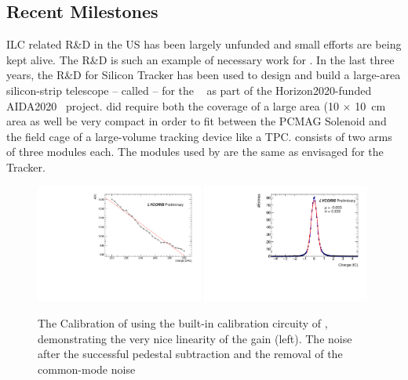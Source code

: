 \subsection{Recent Milestones}
ILC related R\&D in the US has been largely unfunded and small efforts are being kept alive. The \KPIX R\&D is such an example of necessary work for \SID.
In the last three years, the R\&D for \KPIX Silicon Tracker has been used to design and build a large-area silicon-strip 
telescope -- called \LYCORIS -- for the \DIITBF~\cite{desytb2018} as part of the Horizon2020-funded AIDA2020~\cite{AIDA2020} project.
\LYCORIS did require both the coverage of a large area (10 $\times$ \SI{10}{\centi\meter} area as well be very compact in order to fit
between the PCMAG Solenoid and the field cage of a large-volume tracking device like a TPC. \LYCORIS consists of two arms of three modules each. The modules used by \LYCORIS are 
the same as envisaged for the \SID Tracker.
\begin{figure}[htbp]
\includegraphics[width=0.49\textwidth]{Tracker/KPIX/KPIX_Calib_DAC_c0_k0_b0_r0.pdf}
\includegraphics[width=0.49\textwidth]{Tracker/KPIX/KPIX_Gaussian_charge_corr_k0_b0.pdf}
\caption{The Calibration of \LYCORIS using the built-in calibration circuity of \KPIX, demonstrating the very nice linearity of the \KPIX gain (left). The \KPIX noise after the 
successful pedestal subtraction and the removal of the common-mode noise}
\label{fig:SiliconTracking:KPIX:Calibration}
\end{figure}

